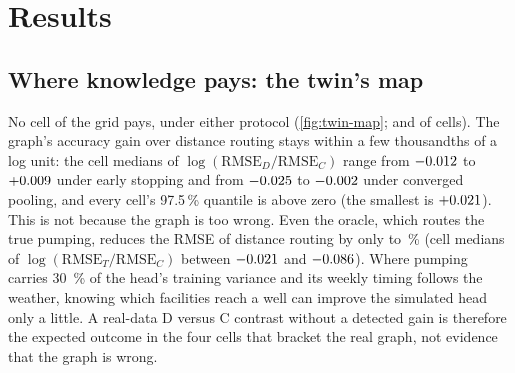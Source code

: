 \section{Results}\label{sec:results}

\subsection{Where knowledge pays: the twin's map}\label{sec:res-twin}

No cell of the grid pays, under either protocol (\cref{fig:twin-map}; \twinPaysFree{} and
\twinPaysPooled{} of \twinCells{} cells). The graph's accuracy gain
over distance routing stays within a few thousandths of a log unit: the cell medians of
$\log(\mathrm{RMSE}_D / \mathrm{RMSE}_C)$ range from $-0.012$ to $+0.009$ under early
stopping and from $-0.025$ to $-0.002$ under converged pooling, and every cell's
97.5\,\% quantile is above zero (the smallest is $+0.021$).
This is not because the graph is too wrong. Even the oracle, which routes the true pumping, reduces
the RMSE of distance routing by only \twinTCGainMinFree{} to \twinTCGainMaxPooled\,\% (cell medians of
$\log(\mathrm{RMSE}_T / \mathrm{RMSE}_C)$ between $-0.021$ and $-0.086$). Where pumping carries \SI{30}{\percent} of the head's training variance and its weekly
timing follows the weather, knowing which facilities reach a well can improve the simulated head only a
little. A real-data D versus C contrast without a detected gain is therefore the expected outcome
in the four cells that bracket the real graph, not evidence that the graph is wrong.

